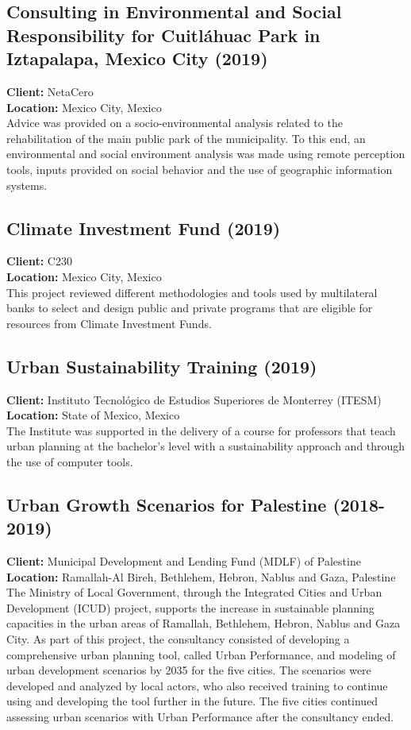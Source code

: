 \documentclass[
	a4paper,
	12pt,
	unnumberedsections,
]{CSSullivanBusinessReport}
\begin{document}
\subsection{Consulting in Environmental and Social Responsibility for Cuitláhuac Park in Iztapalapa, Mexico City (2019)}
\textbf{Client:}  NetaCero \\
\textbf{Location:}  Mexico City, Mexico \\[0.5em]
 Advice was provided on a socio-environmental analysis related to the rehabilitation of the main public park of the municipality. To this end, an environmental and social environment analysis was made using remote perception tools, inputs provided on social behavior and the use of geographic information systems.

\subsection{Climate Investment Fund (2019)}
\textbf{Client:}  C230 \\
\textbf{Location:}  Mexico City, Mexico \\[0.5em]
 This project reviewed different methodologies and tools used by multilateral banks to select and design public and private programs that are eligible for resources from Climate Investment Funds.

\subsection{Urban Sustainability Training (2019)}
\textbf{Client:}  Instituto Tecnológico de Estudios Superiores de Monterrey (ITESM) \\
\textbf{Location:}  State of Mexico, Mexico \\[0.5em]
 The Institute was supported in the delivery of a course for professors that teach urban planning at the bachelor's level with a sustainability approach and through the use of computer tools.

\subsection{Urban Growth Scenarios for Palestine (2018-2019)}
\textbf{Client:}  Municipal Development and Lending Fund (MDLF) of Palestine \\
\textbf{Location:}  Ramallah-Al Bireh, Bethlehem, Hebron, Nablus and Gaza, Palestine \\[0.5em]
 The Ministry of Local Government, through the Integrated Cities and Urban Development (ICUD) project, supports the increase in sustainable planning capacities in the urban areas of Ramallah, Bethlehem, Hebron, Nablus and Gaza City. As part of this project, the consultancy consisted of developing a comprehensive urban planning tool, called Urban Performance, and modeling of urban development scenarios by 2035 for the five cities. The scenarios were developed and analyzed by local actors, who also received training to continue using and developing the tool further in the future. The five cities continued assessing urban scenarios with Urban Performance after the consultancy ended.
\end{document}
